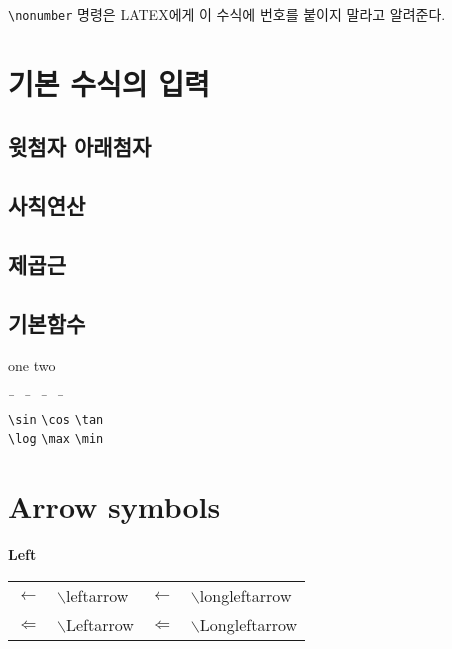 \documentclass[12pt,a4paper]{report}
\begin{document}
	\verb|\nonumber| 명령은 LATEX에게 이 수식에 번호를 붙이지 말라고 알려준다.
	


%
%
%
\clearpage
\section{기본 수식의 입력}

	\subsection{윗첨자 아래첨자}

	\subsection{사칙연산}

	\subsection{제곱근}
	
	\subsection{기본함수}
	
	one \hfill two\\
	
	
		\begin{tabbing}
		~\hspace{3cm}\= ~\hspace{3cm} \= ~\hspace{3cm} \= ~\hspace{3cm} \= \kill \\
		\verb|\sin| \> \verb|\cos| \> \verb|\tan| \> \\
		\verb|\log| \> \verb|\max| \> \verb|\min| \>
		\end{tabbing}
	
	


%
%
%
\clearpage
\section{Arrow symbols}

			\textbf{Left}\\
			\begin{tabular}{ p{} p{} 
							p{} p{}  }
			\toprule
			$\leftarrow$		&$\backslash$leftarrow &
			$\longleftarrow$	&$\backslash$longleftarrow \\
			$\Leftarrow$		&$\backslash$Leftarrow&
			$\Longleftarrow$	&$\backslash$Longleftarrow \\
			\bottomrule
			\end{tabular} \\
			
\end{document}
